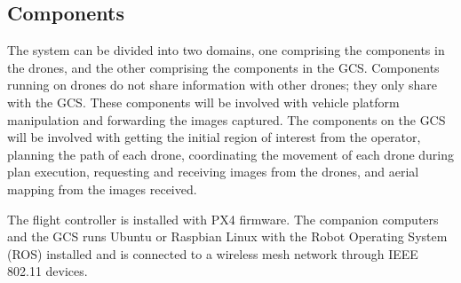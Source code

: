\subsection{Components}

The system can be divided into two domains, one comprising the components in the drones, and the other comprising the components in the GCS. Components running on drones do not share information with other drones; they only share with the GCS. These components will be involved with vehicle platform manipulation and forwarding the images captured. The components on the GCS will be involved with getting the initial region of interest from the operator, planning the path of each drone, coordinating the movement of each drone during plan execution, requesting and receiving images from the drones, and aerial mapping from the images received.

The flight controller is installed with PX4 firmware. The companion computers and the GCS runs Ubuntu or Raspbian Linux with the Robot Operating System (ROS) installed and is connected to a wireless mesh network through IEEE 802.11 devices.

